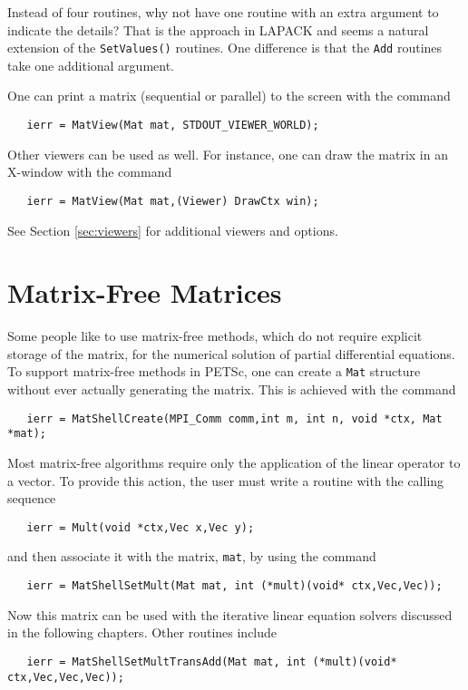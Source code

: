 \begin{design}
Instead of four routines, why not have
one routine with an extra argument to indicate the details? That is 
the approach in LAPACK and seems a natural extension of the 
{\tt SetValues()} routines. One difference is that the {\tt Add} 
routines take one additional argument.
\end{design}

One can print a matrix (sequential or parallel) to the screen with the 
command 
\begin{verbatim}
   ierr = MatView(Mat mat, STDOUT_VIEWER_WORLD);
\end{verbatim}
Other viewers can be used as well. For instance, one can draw the matrix
in an X-window with the command
\begin{verbatim}
   ierr = MatView(Mat mat,(Viewer) DrawCtx win);
\end{verbatim}
See Section \ref{sec:viewers} for additional viewers and options.


\section{Matrix-Free Matrices} 

\label{sec:matrixfree}
Some people like to use matrix-free methods, which do not require
explicit storage of the matrix, for the numerical solution of partial 
differential equations.  
To support matrix-free methods in PETSc, one can create a 
{\tt Mat} structure without ever actually generating the matrix.  
This is achieved with the command 
\begin{verbatim}
   ierr = MatShellCreate(MPI_Comm comm,int m, int n, void *ctx, Mat *mat);
\end{verbatim}
Most matrix-free algorithms require only the application of 
the linear operator to a vector. To provide this action, the user must 
write a routine with the calling sequence
\begin{verbatim}
   ierr = Mult(void *ctx,Vec x,Vec y);
\end{verbatim}
and then associate it with the matrix, {\tt mat}, by using the 
command 
\begin{verbatim}
   ierr = MatShellSetMult(Mat mat, int (*mult)(void* ctx,Vec,Vec));
\end{verbatim}
Now this matrix can be used with the iterative linear equation solvers 
discussed in the following chapters.
Other routines include 
\begin{verbatim}
   ierr = MatShellSetMultTransAdd(Mat mat, int (*mult)(void* ctx,Vec,Vec,Vec));
\end{verbatim}

